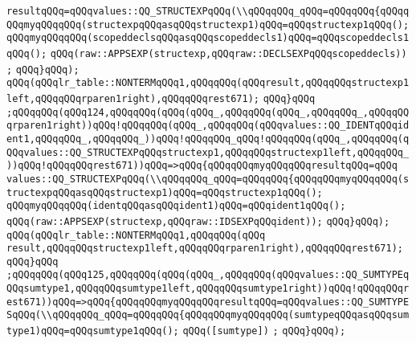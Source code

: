 \verb|resultqQQq=qQQqvalues::QQ_STRUCTEXPqQQq(\\qQQqqQQq_qQQq=qQQqqQQq{qQQqqQQqmyqQQqqQQq(structexpqQQqasqQQqstructexp1)qQQq=qQQqstructexp1qQQq();|\newline
\verb|qQQqmyqQQqqQQq(scopeddeclsqQQqasqQQqscopeddecls1)qQQq=qQQqscopeddecls1qQQq();|\newline
\verb|qQQq(raw::APPSEXP(structexp,qQQqraw::DECLSEXPqQQqscopeddecls))|\newline
\verb|;|\newline
\verb|qQQq}qQQq);|\newline
\verb|qQQq(qQQqlr_table::NONTERMqQQq1,qQQqqQQq(qQQqresult,qQQqqQQqstructexp1left,qQQqqQQqrparen1right),qQQqqQQqrest671);|\newline
\verb|qQQq}qQQq|\newline
\verb|;qQQqqQQq(qQQq124,qQQqqQQq(qQQq(qQQq_,qQQqqQQq(qQQq_,qQQqqQQq_,qQQqqQQqrparen1right))qQQq!qQQqqQQq(qQQq_,qQQqqQQq(qQQqvalues::QQ_IDENTqQQqident1,qQQqqQQq_,qQQqqQQq_))qQQq!qQQqqQQq_qQQq!qQQqqQQq(qQQq_,qQQqqQQq(qQQqvalues::QQ_STRUCTEXPqQQqstructexp1,qQQqqQQqstructexp1left,qQQqqQQq_))qQQq!qQQqqQQqrest671))qQQq=>qQQq{qQQqqQQqmyqQQqqQQqresultqQQq=qQQq|\newline
\verb|values::QQ_STRUCTEXPqQQq(\\qQQqqQQq_qQQq=qQQqqQQq{qQQqqQQqmyqQQqqQQq(structexpqQQqasqQQqstructexp1)qQQq=qQQqstructexp1qQQq();|\newline
\verb|qQQqmyqQQqqQQq(identqQQqasqQQqident1)qQQq=qQQqident1qQQq();|\newline
\verb|qQQq(raw::APPSEXP(structexp,qQQqraw::IDSEXPqQQqident));|\newline
\verb|qQQq}qQQq);|\newline
\verb|qQQq(qQQqlr_table::NONTERMqQQq1,qQQqqQQq(qQQq|\newline
\verb|result,qQQqqQQqstructexp1left,qQQqqQQqrparen1right),qQQqqQQqrest671);|\newline
\verb|qQQq}qQQq|\newline
\verb|;qQQqqQQq(qQQq125,qQQqqQQq(qQQq(qQQq_,qQQqqQQq(qQQqvalues::QQ_SUMTYPEqQQqsumtype1,qQQqqQQqsumtype1left,qQQqqQQqsumtype1right))qQQq!qQQqqQQqrest671))qQQq=>qQQq{qQQqqQQqmyqQQqqQQqresultqQQq=qQQqvalues::QQ_SUMTYPESqQQq(\\qQQqqQQq_qQQq=qQQqqQQq{qQQqqQQqmyqQQqqQQq(sumtypeqQQqasqQQqsumtype1)qQQq=qQQqsumtype1qQQq();|\newline
\verb|qQQq([sumtype])|\newline
\verb|;|\newline
\verb|qQQq}qQQq);|\newline
